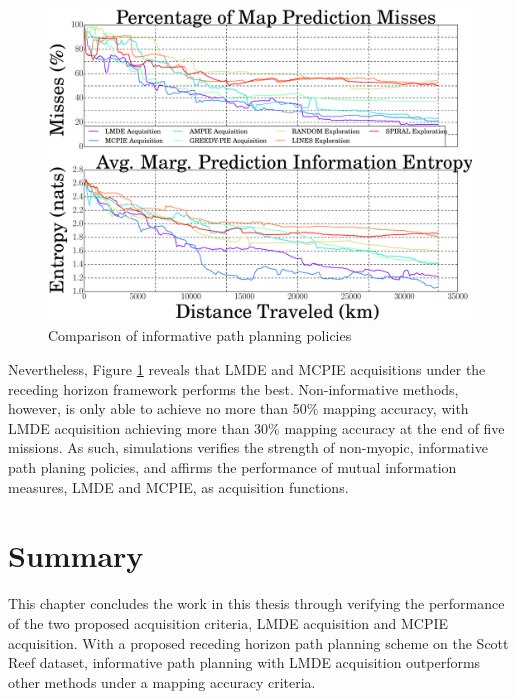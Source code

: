 			\begin{figure}[!htbp]
			\centering
				\includegraphics[width = 0.8\linewidth]{Figures/serial_compare_methods.eps}
			\caption{Comparison of informative path planning policies}
			\label{Figure:SerialCompareMethods}
			\end{figure}
						
			Nevertheless, Figure \ref{Figure:SerialCompareMethods} reveals that LMDE and MCPIE acquisitions under the receding horizon framework performs the best. Non-informative methods, however, is only able to achieve no more than 50\% mapping accuracy, with LMDE acquisition achieving more than 30\% mapping accuracy at the end of five missions. As such, simulations verifies the strength of non-myopic, informative path planing policies, and affirms the performance of mutual information measures, LMDE and MCPIE, as acquisition functions.
								
	\section{Summary}
	
		This chapter concludes the work in this thesis through verifying the performance of the two proposed acquisition criteria, LMDE acquisition and MCPIE acquisition. With a proposed receding horizon path planning scheme on the Scott Reef dataset, informative path planning with LMDE acquisition outperforms other methods under a mapping accuracy criteria.
		
		 
		
		
		